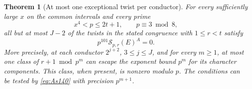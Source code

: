 \documentclass[a4paper,11pt]{article}
\newtheorem{theorem}[proposition]{Theorem}
\theoremstyle{definition}
\theoremstyle{remark}
\numberwithin{equation}{section}
\begin{document}
\begin{theorem}[At most one exceptional twist per conductor]
\label{thm:except140}
For every sufficiently large \(x\) on the common intervals and
every prime
\[
              x^4<p\le2t+1,\qquad p\equiv3\bmod8 ,
\]
all but at most \(J-2\) of the twists in the stated congruence
with \(1\le r<t\) satisfy
\begin{equation}
                p^{101}\mathcal S_{p,r}(E)^A=0 .
                \label{eq:except140}
\end{equation}
More precisely, at each conductor \(2^{j+2}\), \(3\le j\le J\),
and for every \(m\ge1\), at most one class of \(r+1\bmod p^m\)
can escape the exponent bound \(p^m\) for its character
components. This class, when present, is nonzero modulo \(p\).
The conditions can be tested by \eqref{eq:As140} with precision
\(p^{m+1}\).
\end{theorem}
\end{document}
